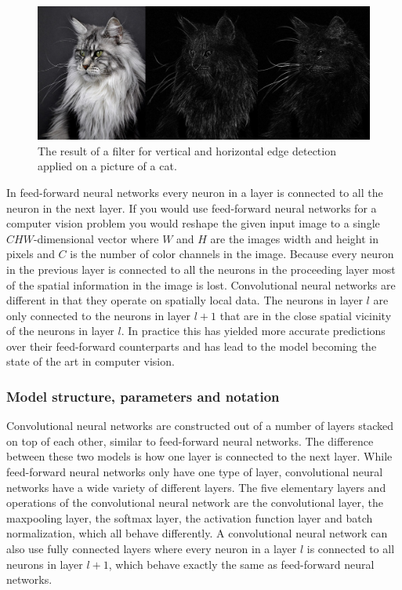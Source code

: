 \documentclass[a4paper,11pt,twoside]{article}
\begin{document}
\begin{figure}[h]
	\centering
  		\includegraphics[scale=0.33]{katter.png}
  	\caption{The result of a filter for vertical and horizontal edge detection applied on a picture of a cat.} \label{figkatter}
\end{figure}

In feed-forward neural networks every neuron in a layer is connected to all the neuron in the next layer. If you would use feed-forward neural networks for a computer vision problem you would reshape the given input image to a single $CHW$-dimensional vector where $W$ and $H$ are the images width and height in pixels and $C$ is the number of color channels in the image. Because every neuron in the previous layer is connected to all the neurons in the proceeding layer most of the spatial information in the image is lost. Convolutional neural networks are different in that they operate on spatially local data. The neurons in layer $l$ are only connected to the neurons in layer $l+1$ that are in the close spatial vicinity of the neurons in layer $l$. In practice this has yielded more accurate predictions over their feed-forward counterparts and has lead to the model becoming the state of the art in computer vision. \cite{cs231n} \cite{convmath} \cite{convarithmetic}

\subsubsection{Model structure, parameters and notation}
Convolutional neural networks are constructed out of a number of layers stacked on top of each other, similar to feed-forward neural networks. The difference between these two models is how one layer is connected to the next layer. While feed-forward neural networks only have one type of layer, convolutional neural networks have a wide variety of different layers. The five elementary layers and operations of the convolutional neural network are the convolutional layer, the maxpooling layer, the softmax layer, the activation function layer and batch normalization, which all behave differently. A convolutional neural network can also use fully connected layers where every neuron in a layer $l$ is connected to all neurons in layer $l+1$, which behave exactly the same as feed-forward neural networks. \cite{cs231n} \cite{convmath} \cite{convarithmetic}
\end{document}
